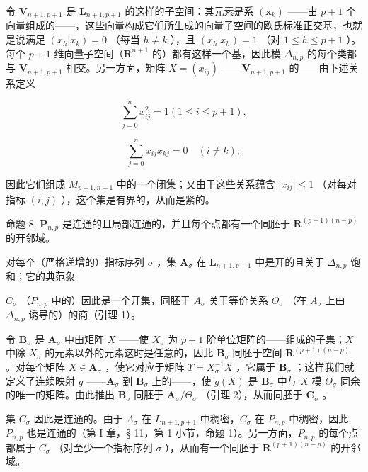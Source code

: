 令 \(\mathbf{V}_{n+1, p+1}\) 是 \(\mathbf{L}_{n+1, p+1}\) 的这样的子空间：其元素是系 \((\boldsymbol{x}_k)\) ——由 \(p + 1\) 个向量组成的——，这些向量构成它们所生成的向量子空间的欧氏标准正交基，也就是说满足 \((x_h | x_k) = 0\) （每当 \(h \neq k\) ），且 \((x_h | x_h) = 1\) （对 \(1 \leqslant h \leqslant p + 1\) ）。每个 \(p + 1\) 维向量子空间（\(\mathbf{R}^{n+1}\) 的）都有这样一个基，因此模 \(\Delta_{n,p}\) 的每个类都与 \(\mathbf{V}_{n+1, p+1}\) 相交。另一方面，矩阵 \(X = (x_{ij})\) ——\(\mathbf{V}_{n+1, p+1}\) 的——由下述关系定义

\[
\sum_ {j = 0} ^ {n} x _ {i j} ^ {2} = 1 (1 \leqslant i \leqslant p + 1),
\]

\[
\sum_ {j = 0} ^ {n} x _ {i j} x _ {k j} = 0 \quad (i \neq k);
\]

因此它们组成 \(M_{p+1, n+1}\) 中的一个闭集；又由于这些关系蕴含 \(|x_{ij}| \leqslant 1\) （对每对指标 \((i, j)\) ），这个集是有界的，从而是紧的。

命题 8. \(\mathbf{P}_{n,p}\) 是连通的且局部连通的，并且每个点都有一个同胚于 \(\mathbf{R}^{(p+1)(n-p)}\) 的开邻域。

对每个（严格递增的）指标序列 \(\sigma\) ，集 \(\mathbf{A}_{\sigma}\) 在 \(\mathbf{L}_{n+1, p+1}\) 中是开的且关于 \(\Delta_{n,p}\) 饱和；它的典范象

\(C_{\sigma}\) （\(P_{n,p}\) 中的）因此是一个开集，同胚于 \(A_{\sigma}\) 关于等价关系 \(\Theta_{\sigma}\) （在 \(A_{\sigma}\) 上由 \(\Delta_{n,p}\) 诱导的）的商（引理 1）。

令 \(\mathbf{B}_{\sigma}\) 是 \(\mathbf{A}_{\sigma}\) 中由矩阵 \(X\) ——使 \(X_{\sigma}\) 为 \(p + 1\) 阶单位矩阵的——组成的子集；\(X\) 中除 \(X_{\sigma}\) 的元素以外的元素这时是任意的，因此 \(\mathbf{B}_{\sigma}\) 同胚于空间 \(\mathbf{R}^{(p + 1)(n - p)}\) 。对每个矩阵 \(X \in \mathbf{A}_{\sigma}\) ，使它对应于矩阵 \(\Upsilon = X_{\sigma}^{-1}X\) ，它属于 \(\mathbf{B}_{\sigma}\) ；这样我们就定义了连续映射 \(g\) ——\(\mathbf{A}_{\sigma}\) 到 \(\mathbf{B}_{\sigma}\) 上的——，使 \(g(X)\) 是 \(\mathbf{B}_{\sigma}\) 中与 \(X\) 模 \(\Theta_{\sigma}\) 同余的唯一的矩阵。由此推出 \(\mathbf{B}_{\sigma}\) 同胚于 \(\mathbf{A}_{\sigma}/\Theta_{\sigma}\) （引理 2），从而同胚于 \(\mathbf{C}_{\sigma}\) 。

集 \(C_{\sigma}\) 因此是连通的。由于 \(A_{\sigma}\) 在 \(L_{n+1, p+1}\) 中稠密，\(C_{\sigma}\) 在 \(P_{n, p}\) 中稠密，因此 \(P_{n, p}\) 也是连通的（第 I 章，§ 11，第 1 小节，命题 1）。另一方面，\(P_{n, p}\) 的每个点都属于 \(C_{\sigma}\) （对至少一个指标序列 \(\sigma\) ），从而有一个同胚于 \(\mathbf{R}^{(p+1)(n-p)}\) 的开邻域。

